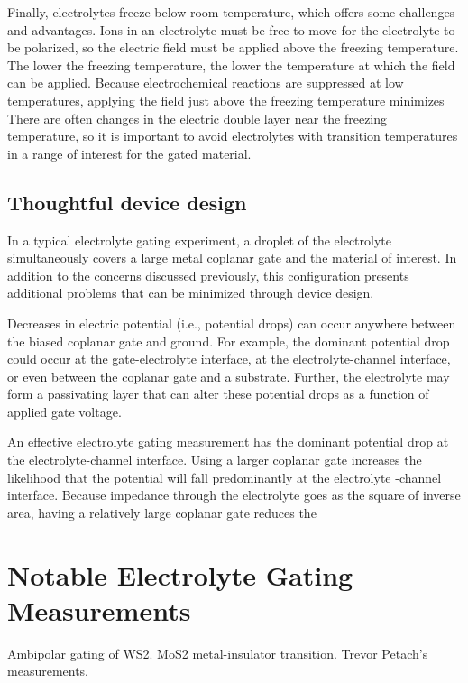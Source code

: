 Finally, electrolytes freeze below room temperature, which offers some challenges and advantages. Ions in an electrolyte must be free to move for the electrolyte to be polarized, so the electric field must be applied above the freezing temperature. The lower the freezing temperature, the lower the temperature at which the field can be applied. Because electrochemical reactions are suppressed at low temperatures, applying the field just above the freezing temperature minimizes There are often changes in the electric double layer near the freezing temperature, so it is important to avoid electrolytes with transition temperatures in a range of interest for the gated material.

\subsection{Thoughtful device design}

In a typical electrolyte gating experiment, a droplet of the electrolyte simultaneously covers a large metal coplanar gate and the material of interest. In addition to the concerns discussed previously, this configuration presents additional problems that can be minimized through device design.

Decreases in electric potential (i.e., potential drops) can occur anywhere between the biased coplanar gate and ground. For example, the dominant potential drop could occur at the gate-electrolyte interface, at the electrolyte-channel interface, or even between the coplanar gate and a substrate. Further, the electrolyte may form a passivating layer that can alter these potential drops as a function of applied gate voltage.

An effective electrolyte gating measurement has the dominant potential drop at the electrolyte-channel interface. Using a larger coplanar gate increases the likelihood that the potential will fall predominantly at the electrolyte -channel interface. Because impedance through the electrolyte goes as the square of inverse area, having a relatively large coplanar gate reduces the 


\section{Notable Electrolyte Gating Measurements}

Ambipolar gating of WS2. MoS2 metal-insulator transition. Trevor Petach's measurements.